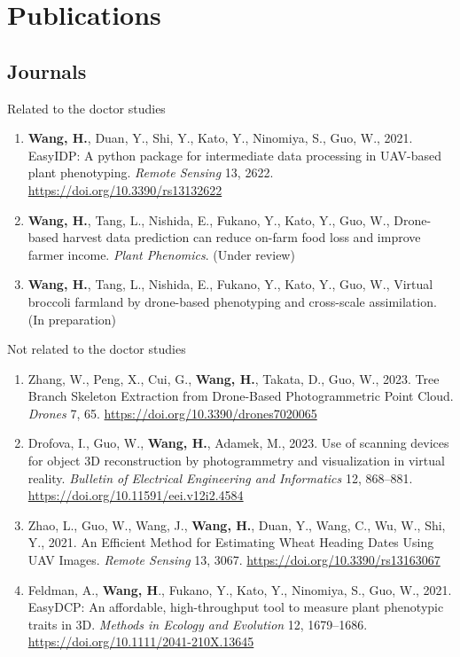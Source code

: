 \chapter*{Publications}

\begin{singlespace}
\section*{Journals}

\noindent
Related to the doctor studies

\begin{enumerate}
  \item \textbf{Wang, H.}, Duan, Y., Shi, Y., Kato, Y., Ninomiya, S., Guo, W., 2021. EasyIDP: A python package for intermediate data processing in UAV-based plant phenotyping. \textit{Remote Sensing} 13, 2622. \url{https://doi.org/10.3390/rs13132622}
  \item \textbf{Wang, H.}, Tang, L., Nishida, E., Fukano, Y., Kato, Y., Guo, W., Drone-based harvest data prediction can reduce on-farm food loss and improve farmer income. \textit{Plant Phenomics}. (Under review)
  \item \textbf{Wang, H.}, Tang, L., Nishida, E., Fukano, Y., Kato, Y., Guo, W., Virtual broccoli farmland by drone-based phenotyping and cross-scale assimilation. (In preparation)
\end{enumerate}

\noindent
Not related to the doctor studies

\begin{enumerate}
  \item Zhang, W., Peng, X., Cui, G., \textbf{Wang, H.}, Takata, D., Guo, W., 2023. Tree Branch Skeleton Extraction from Drone-Based Photogrammetric Point Cloud. \textit{Drones} 7, 65. \url{https://doi.org/10.3390/drones7020065}
  \item Drofova, I., Guo, W., \textbf{Wang, H.}, Adamek, M., 2023. Use of scanning devices for object 3D reconstruction by photogrammetry and visualization in virtual reality. \textit{Bulletin of Electrical Engineering and Informatics} 12, 868–881. \url{https://doi.org/10.11591/eei.v12i2.4584}
  \item Zhao, L., Guo, W., Wang, J., \textbf{Wang, H.}, Duan, Y., Wang, C., Wu, W., Shi, Y., 2021. An Efficient Method for Estimating Wheat Heading Dates Using UAV Images. \textit{Remote Sensing} 13, 3067. \url{https://doi.org/10.3390/rs13163067}
  \item Feldman, A., \textbf{Wang, H}., Fukano, Y., Kato, Y., Ninomiya, S., Guo, W., 2021. EasyDCP: An affordable, high-throughput tool to measure plant phenotypic traits in 3D. \textit{Methods in Ecology and Evolution} 12, 1679–1686. \url{https://doi.org/10.1111/2041-210X.13645}
  

\end{enumerate}
\end{singlespace}
